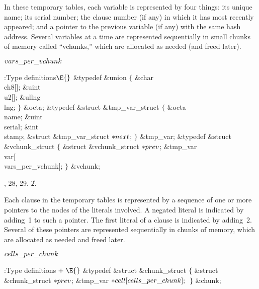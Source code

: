 In these temporary tables, each variable is represented by four things:
its unique name; its serial number; the clause number (if any) in which it has
most recently appeared; and a pointer to the previous variable (if any)
with the same hash address. Several variables at a time
are represented sequentially in small chunks of memory called ``vchunks,''
which are allocated as needed (and freed later).

\Y\B\4\D$\\{vars\_per\_vchunk}$ \5
\par
\Y\B\4:Type definitions\X${}\E{}$\6
\&{typedef} \&{union} ${}\{{}$\1\6
\&{char} \\{ch8}[];\6
\&{uint} \\{u2}[];\6
\&{ullng} \\{lng};\2\6
${}\}{}$ \&{octa};\6
\&{typedef} \&{struct} \&{tmp\_var\_struct} ${}\{{}$\1\6
\&{octa} \\{name};\6
\&{uint} \\{serial};\6
\&{int} \\{stamp};\6
\&{struct} \&{tmp\_var\_struct} ${}{*}\\{next}{}$;\2%
\6
${}\}{}$ \&{tmp\_var};\7
\&{typedef} \&{struct} \&{vchunk\_struct} ${}\{{}$\1\6
\&{struct} \&{vchunk\_struct} ${}{*}\\{prev}{}$;\6
\&{tmp\_var} \\{var}[\\{vars\_per\_vchunk}];\2\6
${}\}{}$ \&{vchunk};\par
{}, 28, 29.
\U2.\fi

Each clause in the temporary tables is represented by a
sequence of
one or more pointers to the  nodes of the literals involved.
A negated literal is indicated by adding~1 to such a pointer.
The first literal of a clause is indicated by adding~2.
Several of these pointers are represented sequentially in chunks
of memory, which are allocated as needed and freed later.

\Y\B\4\D$\\{cells\_per\_chunk}$ \5
\par
\Y\B\4:Type definitions\X${}\mathrel+\E{}$\6
\&{typedef} \&{struct} \&{chunk\_struct} ${}\{{}$\1\6
\&{struct} \&{chunk\_struct} ${}{*}\\{prev}{}$;\6
\&{tmp\_var} ${}{*}\\{cell}[\\{cells\_per\_chunk}];{}$\2\6
${}\}{}$ \&{chunk};\par
\fi


